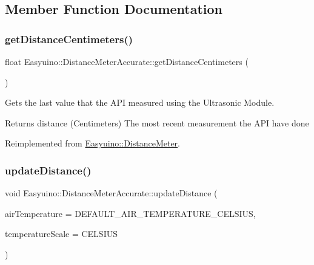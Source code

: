 \subsection{Member Function Documentation}
\mbox{\label{class_easyuino_1_1_distance_meter_accurate_a4de44a347db0bebbf5d74f12397cd4d9}} 
\subsubsection{\texorpdfstring{get\+Distance\+Centimeters()}{getDistanceCentimeters()}}
{\footnotesize\ttfamily float Easyuino\+::\+Distance\+Meter\+Accurate\+::get\+Distance\+Centimeters (\begin{DoxyParamCaption}{ }\end{DoxyParamCaption})\hspace{0.3cm}{\ttfamily [virtual]}}



Gets the last value that the A\+PI measured using the Ultrasonic Module. 

\begin{DoxyReturn}{Returns}
distance (Centimeters) The most recent measurement the A\+PI have done 
\end{DoxyReturn}


Reimplemented from \hyperlink{class_easyuino_1_1_distance_meter_a637cdd0d3e4f3bcf094704ae91e0c7c3}{Easyuino\+::\+Distance\+Meter}.

\mbox{\label{class_easyuino_1_1_distance_meter_accurate_af7c43ebaa1ae75db2f806dc7039c8a82}} 
\subsubsection{\texorpdfstring{update\+Distance()}{updateDistance()}}
{\footnotesize\ttfamily void Easyuino\+::\+Distance\+Meter\+Accurate\+::update\+Distance (\begin{DoxyParamCaption}\item[{IN float}]{air\+Temperature = {\ttfamily DEFAULT\+\_\+AIR\+\_\+TEMPERATURE\+\_\+CELSIUS},  }\item[{IN Temperature\+Scale}]{temperature\+Scale = {\ttfamily CELSIUS} }\end{DoxyParamCaption})}



